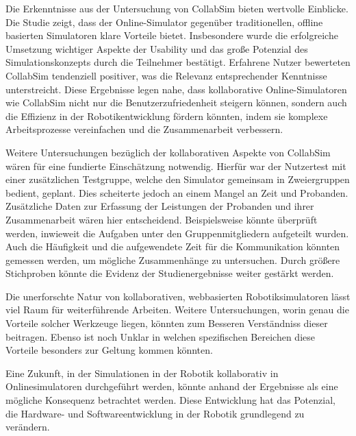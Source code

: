 \documentclass[german,version-2020-11]{uzl-thesis}
\begin{document}
  Die Erkenntnisse aus der Untersuchung von CollabSim bieten wertvolle Einblicke. 
  Die Studie zeigt, dass der Online-Simulator gegenüber traditionellen, offline basierten Simulatoren klare Vorteile bietet. 
  Insbesondere wurde die erfolgreiche Umsetzung wichtiger Aspekte der Usability und das große Potenzial des Simulationskonzepts durch die Teilnehmer bestätigt. 
  Erfahrene Nutzer bewerteten CollabSim tendenziell positiver, was die Relevanz entsprechender Kenntnisse unterstreicht. 
  Diese Ergebnisse legen nahe, dass kollaborative Online-Simulatoren wie CollabSim nicht nur die Benutzerzufriedenheit steigern können, 
  sondern auch die Effizienz in der Robotikentwicklung fördern könnten, indem sie komplexe Arbeitsprozesse vereinfachen und die Zusammenarbeit verbessern.

    Weitere Untersuchungen bezüglich der kollaborativen Aspekte von CollabSim wären für eine fundierte Einschätzung notwendig. 
    Hierfür war der Nutzertest mit einer zusätzlichen Testgruppe, welche den Simulator gemeinsam in Zweiergruppen bedient, geplant. 
    Dies scheiterte jedoch an einem Mangel an Zeit und Probanden.
    Zusätzliche Daten zur Erfassung der Leistungen der Probanden und ihrer Zusammenarbeit wären hier entscheidend. 
    Beispielsweise könnte überprüft werden, inwieweit die Aufgaben unter den Gruppenmitgliedern aufgeteilt wurden. 
    Auch die Häufigkeit und die aufgewendete Zeit für die Kommunikation könnten gemessen werden, um mögliche Zusammenhänge zu untersuchen. 
    Durch größere Stichproben könnte die Evidenz der Studienergebnisse weiter gestärkt werden.
    
    Die unerforschte Natur von kollaborativen, webbasierten Robotiksimulatoren lässt viel Raum für weiterführende Arbeiten. 
    Weitere Untersuchungen, worin genau die Vorteile solcher Werkzeuge liegen, könnten zum Besseren Verständniss dieser beitragen.
    Ebenso ist noch Unklar in welchen spezifischen Bereichen diese Vorteile besonders zur Geltung kommen könnten.

    Eine Zukunft, in der Simulationen in der Robotik kollaborativ in Onlinesimulatoren durchgeführt werden, könnte anhand der Ergebnisse als eine mögliche Konsequenz betrachtet werden. 
    Diese Entwicklung hat das Potenzial, die Hardware- und Softwareentwicklung in der Robotik grundlegend zu verändern.
    



          
        
  
\end{document}
